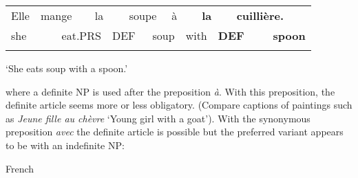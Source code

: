 \begin{tabular}{llllllllllllll}
\lsptoprule
Elle & \multicolumn{2}{l}{mange

} & \multicolumn{2}{l}{la

} & \multicolumn{2}{l}{soupe

} & \multicolumn{2}{l}{à

} & \multicolumn{2}{l}{{\bfseries la}

} & \multicolumn{2}{l}{{\bfseries cuillière.}

} & \\
\multicolumn{2}{l}{she

} & \multicolumn{2}{l}{eat.PRS

} & \multicolumn{2}{l}{DEF

} & \multicolumn{2}{l}{soup

} & \multicolumn{2}{l}{with

} & \multicolumn{2}{l}{{\bfseries DEF}

} & \multicolumn{2}{l}{{\bfseries spoon}

}\\
\lspbottomrule
\end{tabular}

\begin{styleTranslation}
‘She eats soup with a spoon.’

\end{styleTranslation}

\begin{styleBodyTextFirst}
where a definite NP is used after the preposition \textit{à}. With this preposition, the definite article seems more or less obligatory. (Compare captions of paintings such as \textit{Jeune fille au chèvre} ‘Young girl with a goat’). With the synonymous preposition \textit{avec} the definite article is possible but the preferred variant appears to be with an indefinite NP:

\end{styleBodyTextFirst}

\begin{listWWNumileveli}
\item {}

\begin{styleExample}
French

\end{styleExample}

\end{listWWNumileveli}

